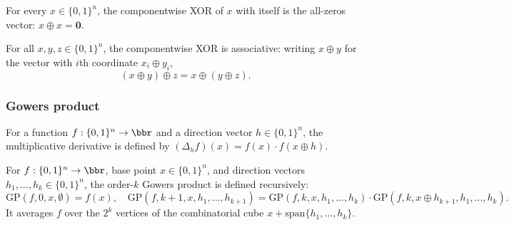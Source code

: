 \begin{lemma}
\label{LowDegreeTest.xor_vec_self}
\leanok
{}
For every $x \in \{0,1\}^n$, the componentwise XOR of $x$ with itself is the all-zeros
vector: $x \oplus x = \mathbf{0}$.
\end{lemma}

\begin{lemma}
\label{LowDegreeTest.xor_vec_assoc}
\leanok
{}
For all $x, y, z \in \{0,1\}^n$, the componentwise XOR is associative: writing $x \oplus
y$ for the vector with $i$th coordinate $x_i \oplus y_i$,
\[
(x \oplus y) \oplus z = x \oplus (y \oplus z).
\]
\end{lemma}

\subsubsection{Gowers product}

\begin{definition}
\label{LowDegreeTest.mult_deriv}
\leanok
{}
For a function $f : \{0,1\}^n \to \bbr$ and a direction vector $h \in \{0,1\}^n$,
the multiplicative derivative is defined by
$(\Delta_h f)(x) = f(x) \cdot f(x \oplus h)$.
\end{definition}

\begin{definition}
\label{LowDegreeTest.gowers_product}
\leanok
{}
For $f : \{0,1\}^n \to \bbr$, base point $x \in \{0,1\}^n$, and direction
vectors $h_1, \ldots, h_k \in \{0,1\}^n$, the order-$k$ Gowers product is defined
recursively:
\[
  \mathrm{GP}(f, 0, x, \emptyset) = f(x),\quad
  \mathrm{GP}(f, k{+}1, x, h_1, \ldots, h_{k+1})
  = \mathrm{GP}(f, k, x, h_1,\ldots,h_k)
    \cdot \mathrm{GP}(f, k, x \oplus h_{k+1}, h_1,\ldots,h_k).
\]
It averages $f$ over the $2^k$ vertices of the combinatorial cube
$x + \mathrm{span}\{h_1,\ldots,h_k\}$.
\end{definition}

